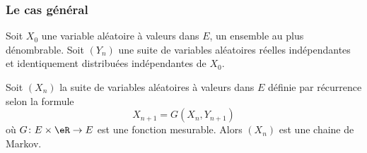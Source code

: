 \subsubsection{Le cas général}

\begin{proposition}     \label{PropqiMdHh}
	Soit \( X_0\) une variable aléatoire à valeurs dans \( E\), un ensemble au plus dénombrable. Soit \( (Y_n)\) une suite de variables aléatoires réelles indépendantes et identiquement distribuées indépendantes de \( X_0\).

	Soit \( (X_n)\) la suite de variables aléatoires à valeurs dans \( E\) définie par récurrence selon la formule
	\begin{equation}
		X_{n+1}=G(X_n,Y_{n+1})
	\end{equation}
	où \( G\colon E\times \eR\to E\) est une fonction mesurable. Alors \( (X_n)\) est une chaine de Markov.
\end{proposition}

